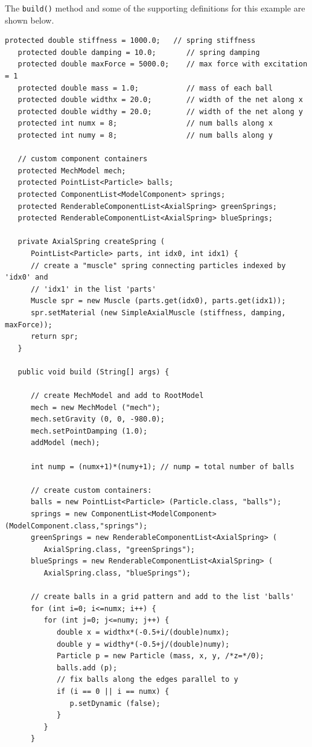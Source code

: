 The {\tt build()} method and some of the supporting definitions for
this example are shown below.
%
\lstset{numbers=left}
\begin{lstlisting}[]
   protected double stiffness = 1000.0;   // spring stiffness
   protected double damping = 10.0;       // spring damping
   protected double maxForce = 5000.0;    // max force with excitation = 1
   protected double mass = 1.0;           // mass of each ball
   protected double widthx = 20.0;        // width of the net along x
   protected double widthy = 20.0;        // width of the net along y
   protected int numx = 8;                // num balls along x
   protected int numy = 8;                // num balls along y

   // custom component containers
   protected MechModel mech;
   protected PointList<Particle> balls;
   protected ComponentList<ModelComponent> springs;   
   protected RenderableComponentList<AxialSpring> greenSprings;
   protected RenderableComponentList<AxialSpring> blueSprings;

   private AxialSpring createSpring (
      PointList<Particle> parts, int idx0, int idx1) {
      // create a "muscle" spring connecting particles indexed by 'idx0' and
      // 'idx1' in the list 'parts'
      Muscle spr = new Muscle (parts.get(idx0), parts.get(idx1));
      spr.setMaterial (new SimpleAxialMuscle (stiffness, damping, maxForce));
      return spr;
   }

   public void build (String[] args) {

      // create MechModel and add to RootModel
      mech = new MechModel ("mech");
      mech.setGravity (0, 0, -980.0);
      mech.setPointDamping (1.0);
      addModel (mech);

      int nump = (numx+1)*(numy+1); // nump = total number of balls

      // create custom containers:
      balls = new PointList<Particle> (Particle.class, "balls");
      springs = new ComponentList<ModelComponent>(ModelComponent.class,"springs");
      greenSprings = new RenderableComponentList<AxialSpring> (
         AxialSpring.class, "greenSprings");
      blueSprings = new RenderableComponentList<AxialSpring> (
         AxialSpring.class, "blueSprings");

      // create balls in a grid pattern and add to the list 'balls'
      for (int i=0; i<=numx; i++) {
         for (int j=0; j<=numy; j++) {
            double x = widthx*(-0.5+i/(double)numx);
            double y = widthy*(-0.5+j/(double)numy);
            Particle p = new Particle (mass, x, y, /*z=*/0);
            balls.add (p);
            // fix balls along the edges parallel to y
            if (i == 0 || i == numx) {
               p.setDynamic (false);
            }
         }
      }


\end{lstlisting}
